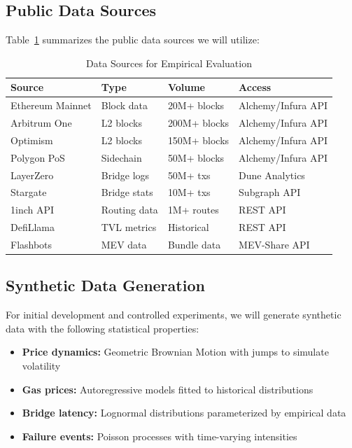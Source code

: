\documentclass[11pt,a4paper]{article}
\begin{document}
\subsection{Public Data Sources}

Table~\ref{tab:data} summarizes the public data sources we will utilize:

\begin{table}[H]
\centering
\caption{Data Sources for Empirical Evaluation}
\label{tab:data}
\begin{tabular}{@{}llll@{}}
\toprule
\textbf{Source} & \textbf{Type} & \textbf{Volume} & \textbf{Access} \\
\midrule
Ethereum Mainnet & Block data & 20M+ blocks & Alchemy/Infura API \\
Arbitrum One & L2 blocks & 200M+ blocks & Alchemy/Infura API \\
Optimism & L2 blocks & 150M+ blocks & Alchemy/Infura API \\
Polygon PoS & Sidechain & 50M+ blocks & Alchemy/Infura API \\
LayerZero & Bridge logs & 50M+ txs & Dune Analytics \\
Stargate & Bridge stats & 10M+ txs & Subgraph API \\
1inch API & Routing data & 1M+ routes & REST API \\
DefiLlama & TVL metrics & Historical & REST API \\
Flashbots & MEV data & Bundle data & MEV-Share API \\
\bottomrule
\end{tabular}
\end{table}

\subsection{Synthetic Data Generation}

For initial development and controlled experiments, we will generate synthetic data with the following statistical properties:

\begin{itemize}[leftmargin=2em]
    \item \textbf{Price dynamics:} Geometric Brownian Motion with jumps to simulate volatility
    \item \textbf{Gas prices:} Autoregressive models fitted to historical distributions
    \item \textbf{Bridge latency:} Lognormal distributions parameterized by empirical data
    \item \textbf{Failure events:} Poisson processes with time-varying intensities
\end{itemize}
\end{document}
